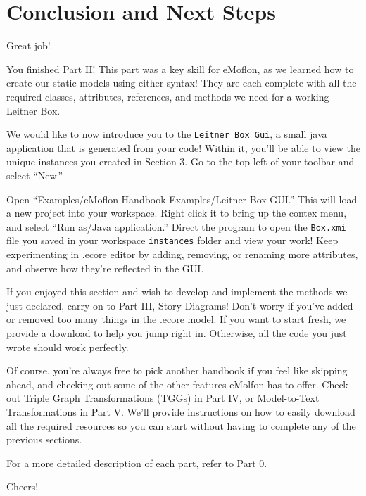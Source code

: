 \genHeader
\section{Conclusion and Next Steps}

\hypertarget{conclusion}{Great job!} You finished Part II! This part was a key skill for eMoflon, as we learned how to create our static models using either syntax! They are each complete with all the required classes, attributes, references, and methods we need for a working Leitner Box.

We would like to now introduce you to the \texttt{Leitner Box Gui}, a small java application that is generated from your code! Within it, you'll be able to view the unique instances you created in Section 3. Go to the top left of your toolbar and select ``New.''

Open ``Examples/eMoflon Handbook Examples/Leitner Box GUI.'' This will load a new project into your workspace. Right click it to bring up the contex menu, and select ``Run as/Java application.'' Direct the program to open the \texttt{Box.xmi} file you saved in your workspace \texttt{instances} folder and view your work! Keep experimenting in .ecore editor by adding, removing, or renaming more attributes, and observe how they're reflected in the GUI.

If you enjoyed this section and wish to develop and implement the methods we just declared, carry on to Part III, Story Diagrams! Don't worry if you've added or removed too many things in the .ecore model. If you want to start fresh, we provide a download to help you jump right in. Otherwise, all the code you just wrote should work perfectly.

Of course, you're always free to pick another handbook if you feel like skipping ahead, and checking out some of the other features eMolfon has to offer. Check out Triple Graph Transformations (TGGs)  in Part IV, or Model-to-Text Transformations in Part V. We'll provide instructions on how to easily download all the required resources so you can start without having to complete any of the previous sections. 

For a more detailed description of each part, refer to Part 0.

Cheers!